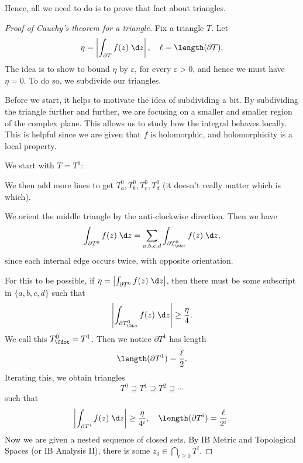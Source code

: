 \documentclass[a4paper]{article}
\begin{document}
Hence, all we need to do is to prove that fact about triangles.
\begin{proof}[Proof of Cauchy's theorem for a triangle]
  Fix a triangle $T$. Let
  \[
    \eta = \left|\int_{\partial T} f(z)\;\d z\right|,\quad \ell = \length (\partial T).
  \]
  The idea is to show to bound $\eta$ by $\varepsilon$, for every $\varepsilon > 0$, and hence we must have $\eta = 0$. To do so, we subdivide our triangles.

  Before we start, it helps to motivate the idea of subdividing a bit. By subdividing the triangle further and further, we are focusing on a smaller and smaller region of the complex plane. This allows us to study how the integral behaves locally. This is helpful since we are given that $f$ is holomorphic, and holomorphicity is a local property.

  We start with $T = T^0:$
  \begin{center}
  \end{center}
  We then add more lines to get $T_a^0, T_b^0, T_c^0, T_d^0$ (it doesn't really matter which is which).
  \begin{center}
  \end{center}
  We orient the middle triangle by the anti-clockwise direction. Then we have
  \[
    \int_{\partial T^0} f(z)\;\d z = \sum_{a, b, c, d} \int_{\partial T^0_{\Cdot}} f(z)\;\d z,
  \]
  since each internal edge occurs twice, with opposite orientation.

  For this to be possible, if $\eta = \left|\int_{\partial T^0} f(z)\;\d z\right|$, then there must be some subscript in $\{a, b, c, d\}$ such that
  \[
    \left|\int_{\partial T^0_{\Cdot}} f(z)\;\d z\right| \geq \frac{\eta}{4}.
  \]
  We call this $T_{\Cdot}^0 = T^1$. Then we notice $\partial T^1$ has length
  \[
    \length(\partial T^1) = \frac{\ell}{2}.
  \]
  Iterating this, we obtain triangles
  \[
    T^0 \supseteq T^1 \supseteq T^2 \supseteq \cdots
  \]
  such that
  \[
    \left|\int_{\partial T^i} f(z)\;\d z\right| \geq \frac{\eta}{4^i},\quad \length (\partial T^i) = \frac{\ell}{2^i}.
  \]
  Now we are given a nested sequence of closed sets. By IB Metric and Topological Spaces (or IB Analysis II), there is some $z_0 \in \bigcap_{i \geq 0} T^i$.


\end{proof}
\end{document}
